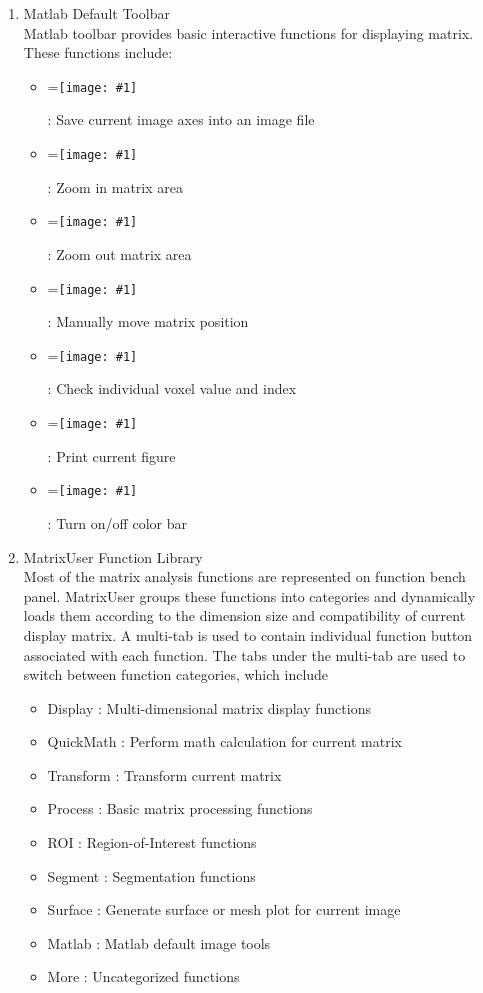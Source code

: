 \documentclass{article}%
\newcommand{\vcenteredinclude}[1]{
\begingroup
\setbox0=\hbox{\texttt{[image: \#1]}}
\parbox{\wd0}{\box0}\endgroup}
\begin{document}
\begin{enumerate}

	\item Matlab Default Toolbar  \\
	
	Matlab toolbar provides basic interactive functions for displaying matrix. These functions include:
	
	\begin{itemize}
		\item \vcenteredinclude{Pictures/SaveFig.eps} : Save current image axes into an image file
		\item \vcenteredinclude{Pictures/ZoomIn.eps} : Zoom in matrix area
		\item \vcenteredinclude{Pictures/ZoomOut.eps} : Zoom out matrix area
		\item \vcenteredinclude{Pictures/Pan.eps} : Manually move matrix position
		\item \vcenteredinclude{Pictures/DataCursor.eps} : Check individual voxel value and index
		\item \vcenteredinclude{Pictures/Print.eps} : Print current figure
		\item \vcenteredinclude{Pictures/Colorbar.eps} : Turn on/off color bar
	\end{itemize}
	
	\item MatrixUser Function Library \\
	
	Most of the matrix analysis functions are represented on function bench panel. MatrixUser groups these functions into categories and dynamically loads them according to
	the dimension size and compatibility of current display matrix. A multi-tab is used to contain individual function button associated with each function. 
	The tabs under the multi-tab are used to switch between function categories, which include
	
	\begin{itemize}
		\item Display : Multi-dimensional matrix display functions
		\item QuickMath : Perform math calculation for current matrix
		\item Transform : Transform current matrix
		\item Process : Basic matrix processing functions
		\item ROI : Region-of-Interest functions
		\item Segment : Segmentation functions
		\item Surface : Generate surface or mesh plot for current image
		\item Matlab : Matlab default image tools
		\item More : Uncategorized functions
	\end{itemize}
	

\end{enumerate}
\end{document}
